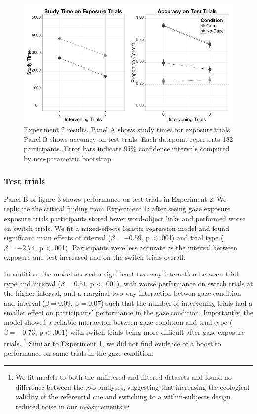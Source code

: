 \documentclass[a4paper,man,natbib]{apa6}
\newenvironment{CodeChunk}{}{}
\begin{document}
\begin{CodeChunk}
\begin{figure}
\includegraphics{figs/expt2-plot-1} \caption[Experiment 2 results]{Experiment 2 results. Panel A shows study times for exposure trials. Panel B shows accuracy on test trials. Each datapoint represents 182 participants. Error bars indicate 95\% confidence intervals computed by non-parametric bootstrap.}\label{fig:expt2-plot}
\end{figure}
\end{CodeChunk}

\subsubsection{Test trials}\label{test-trials-1}

Panel B of figure 3 shows performance on test trials in Experiment 2. We
replicate the critical finding from Experiment 1: after seeing gaze
exposure exposure trials participants stored fewer word-object links and
performed worse on switch trials. We fit a mixed-effects logistic
regression model and found significant main effects of interval
(\(\beta = -0.59\), p \textless{} .001) and trial type
(\(\beta = -2.74\), p \textless{} .001). Participants were less accurate
as the interval between exposure and test increased and on the switch
trials overall.

In addition, the model showed a significant two-way interaction between
trial type and interval (\(\beta = 0.51\), p \textless{} .001), with
worse performance on switch trials at the higher interval, and a
marginal two-way interaction betwen gaze condition and interval
(\(\beta = 0.09\), p = 0.07) such that the number of intervening trials
had a smaller effect on participants' performance in the gaze condition.
Importantly, the model showed a reliable interaction between gaze
condition and trial type (\(\beta = -0.73\), p \textless{} .001) with
switch trials being more difficult after gaze exposure trials.
\footnote{We fit models to both the unfiltered and filtered datasets and found no difference between the two analyses, suggesting that increasing the ecological validity of the referential cue and switching to a within-subjects design reduced noise in our measurements.}
Similar to Experiment 1, we did not find evidence of a boost to
performance on same trials in the gaze condition.
\end{document}
